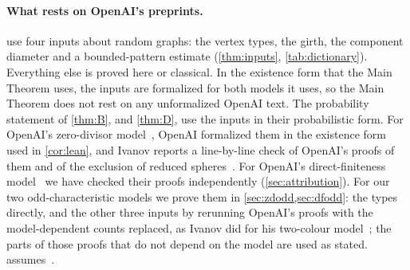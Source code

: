 \documentclass[11pt]{article}
\theoremstyle{definition}
\theoremstyle{plain}
\begin{document}
\paragraph{What rests on OpenAI's preprints.}  use four inputs about random graphs: the vertex types, the girth, the component diameter and a bounded-pattern estimate (\cref{thm:inputs}, \cref{tab:dictionary}). Everything else is proved here or classical. In the existence form that the Main Theorem uses, the inputs are formalized for both models it uses, so the Main Theorem does not rest on any unformalized OpenAI text. The probability statement of \cref{thm:B}, and \cref{thm:D}, use the inputs in their probabilistic form. For OpenAI's zero-divisor model~\cite{OAI196}, OpenAI formalized them in the existence form used in \cref{cor:lean}, and Ivanov reports a line-by-line check of OpenAI's proofs of them and of the exclusion of reduced spheres~\cite[\S1.4 and Appendix~A]{Ivanov2026}. For OpenAI's direct-finiteness model~\cite{OAI197a} we have checked their proofs independently (\cref{sec:attribution}). For our two odd-characteristic models we prove them in \cref{sec:zdodd,sec:dfodd}: the types directly, and the other three inputs by rerunning OpenAI's proofs with the model-dependent counts replaced, as Ivanov did for his two-colour model~\cite[\S\S4--6]{Ivanov2026}; the parts of those proofs that do not depend on the model are used as stated.  assumes~\cite{OAI197b}.
\end{document}
